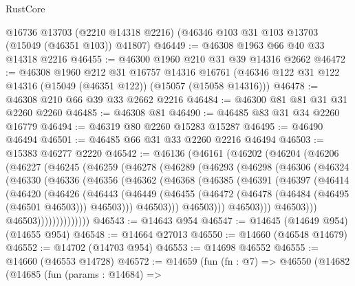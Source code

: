 \begin{lexlean}{RustCore}
\begin{coremodule}
    @16736
    @13703
    (@2210 @14318 @2216)
    (@46346 @103 @31 @103 @13703 (@15049 (@46351 @103)) @41807)
@46449 := @46308 @1963 @66 @40 @33 @14318 @2216
@46455 := @46300 @1960 @210 @31 @39 @14316 @2662
@46472 := @46308
    @1960
    @212
    @31
    @16757
    @14316
    @16761
    (@46346 @122 @31 @122 @14316 (@15049 (@46351 @122)) (@15057 (@15058 @14316)))
@46478 := @46308 @210 @66 @39 @33 @2662 @2216
@46484 := @46300 @81 @81 @31 @31 @2260 @2260
@46485 := @46308 @81
@46490 := @46485 @83 @31 @34 @2260 @16779
@46494 := @46319 @80 @2260 @15283 @15287
@46495 := @46490 @46494
@46501 := @46485 @66 @31 @33 @2260 @2216 @46494
@46503 := @15383 @46277 @2220
@46542 := @46136
    (@46161
      (@46202
        (@46204
          (@46206
            (@46227
              (@46245
                (@46259
                  (@46278
                    (@46289
                      (@46293
                        (@46298
                          (@46306
                            (@46324
                              (@46330
                                (@46336
                                  (@46356
                                    (@46362
                                      (@46368
                                        (@46385
                                          (@46391
                                            (@46397
                                              (@46414
                                                (@46420
                                                  (@46426
                                                    (@46443
                                                      (@46449
                                                        (@46455
                                                          (@46472
                                                            (@46478
                                                              (@46484 (@46495 (@46501 @46503)))
                                                              @46503)))
                                                        @46503)))
                                                  @46503)))
                                            @46503)))
                                      @46503)))
                                @46503))))))))))))))
@46543 := @14643 @954
@46547 := @14645 (@14649 @954) (@14655 @954)
@46548 := @14664 @27013
@46550 := @14660 (@46548 @14679)
@46552 := @14702 (@14703 @954)
@46553 := @14698 @46552
@46555 := @14660 (@46553 @14728)
@46572 := @14659
    (fun (fn : @7) =>
    @46550
      (@14682
        (@14685
          (fun (params : @14684) =>

\end{coremodule}
\end{lexlean}
